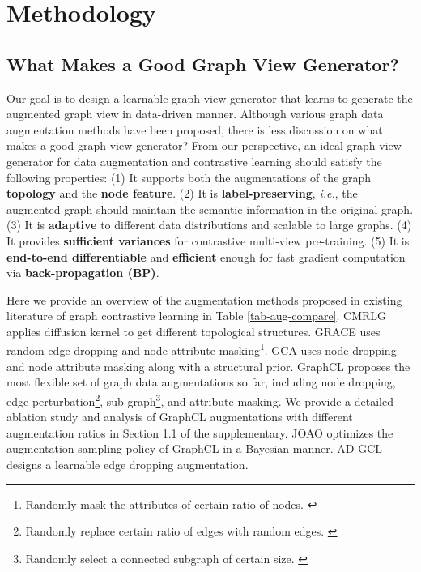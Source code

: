 \section{Methodology}

\subsection{What Makes a Good Graph View Generator?}
\label{sec-insight}

Our goal is to design a learnable graph view generator that learns to generate the augmented graph view in data-driven manner. Although various graph data augmentation methods have been proposed, there is less discussion on what makes a good graph view generator? From our perspective, an ideal graph view generator for data augmentation and contrastive learning should satisfy the following properties: (1) It supports both the augmentations of the graph \textbf{topology} and the \textbf{node feature}. (2) It is \textbf{label-preserving}, \textit{i.e.}, the augmented graph should maintain the semantic information in the original graph.
(3) It is \textbf{adaptive} to different data distributions and scalable to large graphs. (4) It provides \textbf{sufficient variances} for contrastive multi-view pre-training. (5) It is \textbf{end-to-end differentiable} and \textbf{efficient} enough for fast gradient computation via \textbf{back-propagation (BP)}.

Here we provide an overview of the augmentation methods proposed in existing literature of graph contrastive learning in Table \ref{tab-aug-compare}. CMRLG \cite{hassani2020cmcgnn} applies diffusion kernel to get different topological structures. GRACE \cite{zhu2020grace} uses random edge dropping and node attribute masking\footnote{Randomly mask the attributes of certain ratio of nodes. \label{foot-attr-mask}}. GCA \cite{zhu2020gca} uses node dropping and node attribute masking along with a structural prior. GraphCL \cite{you2020graphcl} proposes the most flexible set of graph data augmentations so far, including node dropping, edge perturbation\footnote{Randomly replace certain ratio of edges with random edges. \label{foot-edge-perturb}}, sub-graph\footnote{Randomly select a connected subgraph of certain size. \label{foot-subgraph}}, and attribute masking. We provide a detailed ablation study and analysis of GraphCL augmentations with different augmentation ratios in Section 1.1 of the supplementary. JOAO \cite{you2021joao} optimizes the augmentation sampling policy of GraphCL in a Bayesian manner. AD-GCL \cite{suresh2021adgcl} designs a learnable edge dropping augmentation.

